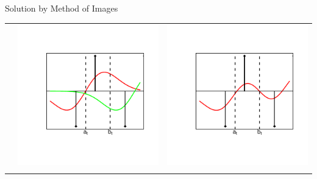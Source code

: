 \documentclass{beamer}
\begin{document}
\begin{frame}{Solution by Method of Images}
\begin{centering}
\begin{tabular}{ccc}
&

\begin{minipage}{0.3\textwidth}
	\includegraphics[scale=0.4,angle=0]{./section-2-figures/g1r1.pdf}
\end{minipage}
\pause

&

\begin{minipage}{0.3\textwidth}
	\includegraphics[scale=0.4,angle=0]{./section-2-figures/g2.pdf}
\end{minipage}
\vspace{-15mm}
\\\hspace{-10mm}
\pause


\end{tabular}
\end{centering}
\end{frame}
\end{document}
